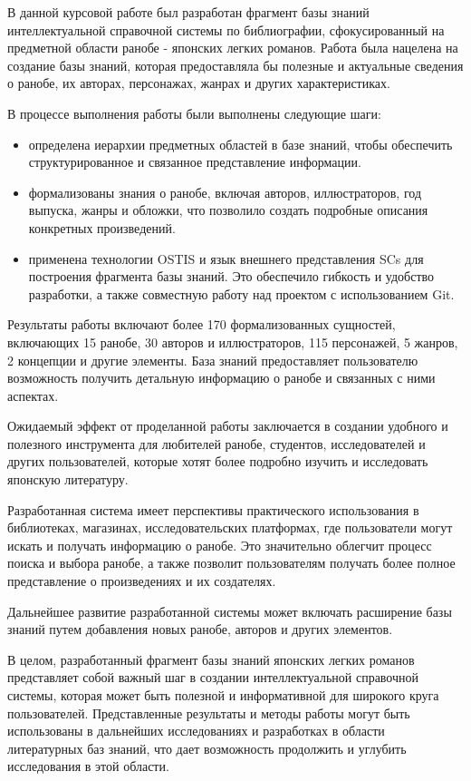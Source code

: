 
В данной курсовой работе был разработан фрагмент базы знаний интеллектуальной справочной системы по библиографии, сфокусированный на предметной области ранобе - японских легких романов. Работа была нацелена на создание базы знаний, которая предоставляла бы полезные и актуальные сведения о ранобе, их авторах, персонажах, жанрах и других характеристиках.

В процессе выполнения работы были выполнены следующие шаги:
\begin{itemize}
    \item определена иерархии предметных областей в базе знаний, чтобы обеспечить структурированное и связанное представление информации.
    \item формализованы знания о ранобе, включая авторов, иллюстраторов, год выпуска, жанры и обложки, что позволило создать подробные описания конкретных произведений.
    \item применена технологии OSTIS и язык внешнего представления SCs для построения фрагмента базы знаний. Это обеспечило гибкость и удобство разработки, а также совместную работу над проектом с использованием Git.
\end{itemize}

Результаты работы включают более 170 формализованных сущностей, включающих 15 ранобе, 30 авторов и иллюстраторов, 115 персонажей, 5 жанров, 2 концепции и другие элементы. База знаний предоставляет пользователю возможность получить детальную информацию о ранобе и связанных с ними аспектах.

Ожидаемый эффект от проделанной работы заключается в создании удобного и полезного инструмента для любителей ранобе, студентов, исследователей и других пользователей, которые хотят более подробно изучить и исследовать японскую литературу.

Разработанная система имеет перспективы практического использования в библиотеках, магазинах, исследовательских платформах, где пользователи могут искать и получать информацию о ранобе. Это значительно облегчит процесс поиска и выбора ранобе, а также позволит пользователям получать более полное представление о произведениях и их создателях.

Дальнейшее развитие разработанной системы может включать расширение базы знаний путем добавления новых ранобе, авторов и других элементов.

В целом, разработанный фрагмент базы знаний японских легких романов представляет собой важный шаг в создании интеллектуальной справочной системы, которая может быть полезной и информативной для широкого круга пользователей. Представленные результаты и методы работы могут быть использованы в дальнейших исследованиях и разработках в области литературных баз знаний, что дает возможность продолжить и углубить исследования в этой области.
